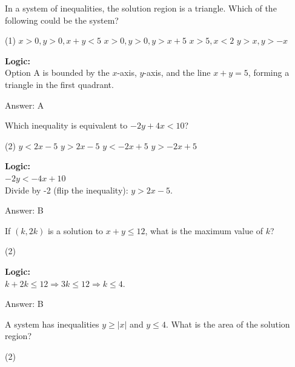 \documentclass[11pt,paper=a4,answers]{exam}
\begin{document}
\begin{questions}
\question
In a system of inequalities, the solution region is a triangle. Which of the following could be the system?
\begin{tasks}(1)
    \task $x > 0, y > 0, x + y < 5$
    \task $x > 0, y > 0, y > x + 5$
    \task $x > 5, x < 2$
    \task $y > x, y > -x$
\end{tasks}

\begin{solution}
\textbf{Logic:} \\
Option A is bounded by the $x$-axis, $y$-axis, and the line $x+y=5$, forming a triangle in the first quadrant.

\vspace{15pt}
Answer: \colorbox{yellow!100}{A}
\end{solution}

\question
Which inequality is equivalent to $-2y + 4x < 10$?
\begin{tasks}(2)
    \task $y < 2x - 5$
    \task $y > 2x - 5$
    \task $y < -2x + 5$
    \task $y > -2x + 5$
\end{tasks}

\begin{solution}
\textbf{Logic:} \\
$-2y < -4x + 10$ \\
Divide by -2 (flip the inequality): $y > 2x - 5$.

\vspace{15pt}
Answer: \colorbox{yellow!100}{B}
\end{solution}

\question
If $(k, 2k)$ is a solution to $x + y \le 12$, what is the maximum value of $k$?
\begin{tasks}(2)
\end{tasks}

\begin{solution}
\textbf{Logic:} \\
$k + 2k \le 12 \Rightarrow 3k \le 12 \Rightarrow k \le 4$.

\vspace{15pt}
Answer: \colorbox{yellow!100}{B}
\end{solution}

\question
A system has inequalities $y \ge |x|$ and $y \le 4$. What is the area of the solution region?
\begin{tasks}(2)
\end{tasks}


\end{questions}
\end{document}
